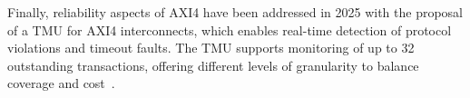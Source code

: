Finally, reliability aspects of AXI4 have been addressed in 2025 with the proposal of a \ac{TMU} for AXI4 interconnects, which enables real-time detection of protocol violations and timeout faults. The \ac{TMU} supports monitoring of up to 32 outstanding transactions, offering different levels of granularity to balance coverage and cost~\cite{liang_towards_2025}.
